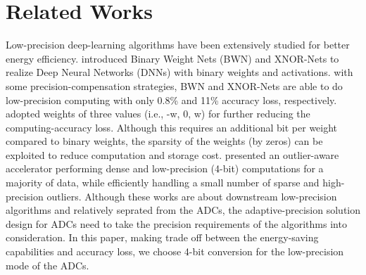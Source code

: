 \section{Related Works}\label{related}

Low-precision deep-learning algorithms have been extensively studied \cite{leibe_xnor-net_2016} \cite{li_ternary_2016}\cite{park_energy-efficient_2018} for better energy efficiency. \cite{leibe_xnor-net_2016} introduced Binary Weight Nets (BWN) and XNOR-Nets to realize
Deep Neural Networks (DNNs) with binary weights and activations. 
with some precision-compensation strategies, BWN and XNOR-Nets are able to do low-precision computing with only 0.8\% and 11\% accuracy loss, respectively.
\cite{li_ternary_2016} adopted weights of three values (i.e., -w, 0, w) for further reducing the computing-accuracy loss. Although this requires an additional bit per weight compared to binary weights, the sparsity of the weights (by zeros) can be exploited to reduce computation and storage cost.
\cite{park_energy-efficient_2018} presented an outlier-aware accelerator performing dense and low-precision (4-bit) computations for a majority of data, while efficiently handling a small number of sparse and high-precision outliers.
Although these works are about downstream low-precision algorithms and relatively seprated from the ADCs, the adaptive-precision solution design for ADCs need to take the precision requirements of the algorithms into consideration. In this paper, making trade off between the energy-saving capabilities and accuracy loss, we choose 4-bit conversion for the low-precision mode of the ADCs.

